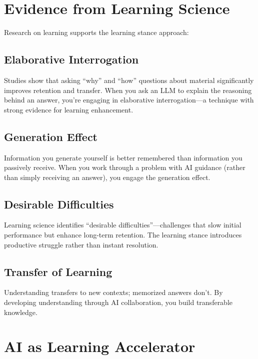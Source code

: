 \section{Evidence from Learning Science}

Research on learning supports the learning stance approach:

\subsection{Elaborative Interrogation}

Studies show that asking ``why'' and ``how'' questions about material significantly improves retention and transfer. When you ask an LLM to explain the reasoning behind an answer, you're engaging in elaborative interrogation---a technique with strong evidence for learning enhancement.

\subsection{Generation Effect}

Information you generate yourself is better remembered than information you passively receive. When you work through a problem with AI guidance (rather than simply receiving an answer), you engage the generation effect.

\subsection{Desirable Difficulties}

Learning science identifies ``desirable difficulties''---challenges that slow initial performance but enhance long-term retention. The learning stance introduces productive struggle rather than instant resolution.

\subsection{Transfer of Learning}

Understanding transfers to new contexts; memorized answers don't. By developing understanding through AI collaboration, you build transferable knowledge.

\section{AI as Learning Accelerator}\label{sec:learning-accelerator}

